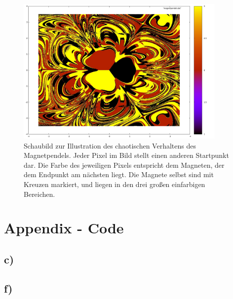 \begin{figure}[t]
	\centering
	\includegraphics[width=290pt]{img/plot2.pdf}
	\caption{Schaubild zur Illustration des chaotischen Verhaltens des Magnetpendels. Jeder Pixel im Bild stellt einen anderen Startpunkt dar. Die Farbe des jeweiligen Pixels entspricht dem Magneten, der dem Endpunkt am nächsten liegt. Die Magnete selbst sind mit Kreuzen markiert, und liegen in den drei großen einfarbigen Bereichen.}
	\label{fig:Bild}
\end{figure}

\clearpage
\section*{Appendix - Code}
\subsection*{c)}


\clearpage
\subsection*{f)}




